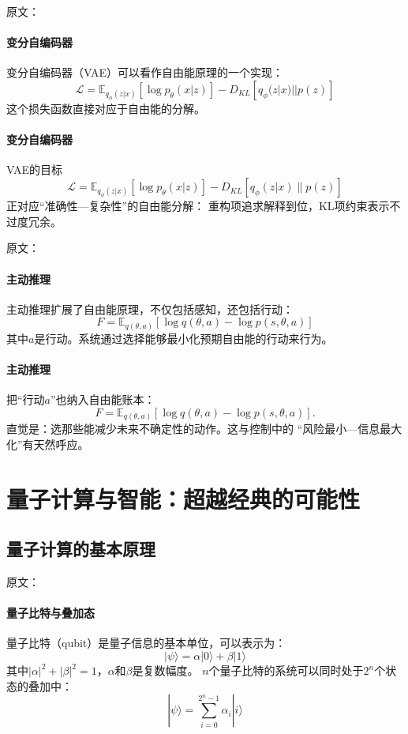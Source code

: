 原文：
\paragraph{变分自编码器}
变分自编码器（VAE）可以看作自由能原理的一个实现：
$$\mathcal{L} = \mathbb{E}_{q_{\phi}(z|x)}[\log p_{\theta}(x|z)] - D_{KL}[q_{\phi}(z|x)||p(z)]$$
这个损失函数直接对应于自由能的分解。
\paragraph{变分自编码器}
VAE的目标
$$\mathcal{L}=\mathbb{E}_{q_\phi(z|x)}[\log p_\theta(x|z)]-D_{KL}[q_\phi(z|x)\|p(z)]$$
正对应“准确性—复杂性”的自由能分解：  
重构项追求解释到位，KL项约束表示不过度冗余。

原文：
\paragraph{主动推理}
主动推理扩展了自由能原理，不仅包括感知，还包括行动：
$$F = \mathbb{E}_{q(\theta,a)}[\log q(\theta,a) - \log p(s,\theta,a)]$$
其中$a$是行动。系统通过选择能够最小化预期自由能的行动来行为。
\paragraph{主动推理}
把“行动$a$”也纳入自由能账本：
$$F=\mathbb{E}_{q(\theta,a)}[\log q(\theta,a)-\log p(s,\theta,a)].$$
直觉是：选那些能减少未来不确定性的动作。\;这与控制中的  
“风险最小—信息最大化”有天然呼应。

\section{量子计算与智能：超越经典的可能性}

\subsection{量子计算的基本原理}

原文：
\paragraph{量子比特与叠加态}
量子比特（qubit）是量子信息的基本单位，可以表示为：
$$|\psi\rangle = \alpha|0\rangle + \beta|1\rangle$$
其中$|\alpha|^2 + |\beta|^2 = 1$，$\alpha$和$\beta$是复数幅度。
$n$个量子比特的系统可以同时处于$2^n$个状态的叠加中：
$$|\psi\rangle = \sum_{i=0}^{2^n-1} \alpha_i |i\rangle$$
